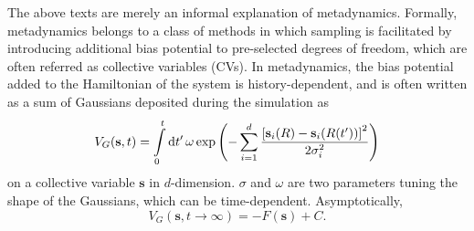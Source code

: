 
The above texts are merely an informal explanation of metadynamics. Formally, metadynamics belongs to a class of methods in which sampling is facilitated by introducing additional bias potential to pre-selected degrees of freedom, which are often referred as collective variables (CVs). In metadynamics, the bias potential added to the Hamiltonian of the system is history-dependent, and is often written as a sum of Gaussians deposited during the simulation as
\begin{equation}
   V_G(\mathbf{s},t) = \int\limits_0^t\mathop{}\!\mathrm{d} t^\prime\, \omega\exp{\left(-\sum\limits_{i=1}^{d}\frac{\left[\mathbf{s}_i(R)-\mathbf{s}_i(R(t^\prime))\right]^2}{2\sigma_i^2}\right)}
\end{equation}
on a collective variable $\mathbf{s}$ in $d$-dimension. $\sigma$ and $\omega$ are two parameters tuning the shape of the Gaussians, which can be time-dependent. Asymptotically, 
\begin{equation}
   V_G(\mathbf{s},t\rightarrow \infty) = -F(\mathbf{s})+C.
\end{equation}

